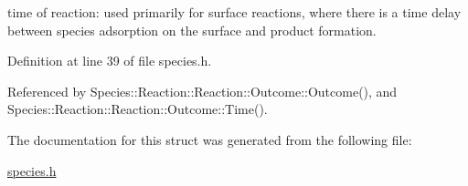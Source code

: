 time of reaction: used primarily for surface reactions, where there is a time delay between species adsorption on the surface and product formation. 

Definition at line 39 of file species.h.

Referenced by Species::Reaction::Reaction::Outcome::Outcome(), and Species::Reaction::Reaction::Outcome::Time().

The documentation for this struct was generated from the following file:\begin{CompactItemize}
\item 
\hyperlink{species_8h}{species.h}\end{CompactItemize}
